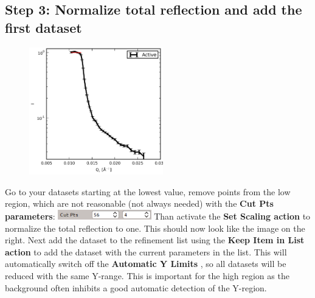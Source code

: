   \subsection{Step 3: Normalize total reflection and add the first dataset}
    \begin{figure}
     \includegraphics[width=165pt]{screenshots/totalreflection.png} 
    \end{figure}
    Go to your datasets starting at the lowest \Qz value, remove points from the low \Qz region, which are not reasonable (not always needed) with the \textbf{Cut Pts parameters}:
    \includegraphics[width=115pt]{screenshots/cutpoints.png} Than activate the \textbf{Set Scaling action}  to normalize the total reflection to one.
    This should now look like the image on the right.
    Next add the dataset to the refinement list using the \textbf{Keep Item in List action}  to add the dataset with the current parameters in the list.
    This will automatically switch off the \textbf{Automatic Y Limits} , so all datasets will be reduced with the same Y-range.
    This is important for the high \Qz region as the background often inhibits a good automatic detection of the Y-region.
    
  
